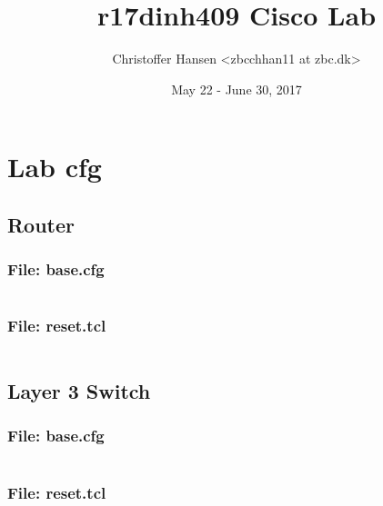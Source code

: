 \documentclass{article}
\begin{document}
\title{r17dinh409 Cisco Lab}
\author{Christoffer Hansen <zbcchhan11 at zbc.dk>}
\date{May 22 - June 30, 2017}
\maketitle

\newpage
\tableofcontents


%
%
\section{Lab cfg}


\subsection{Router}
\subsubsection{File: base.cfg}
\inputminted[frame=lines,framesep=2mm,baselinestretch=1.2,bgcolor=lightgray,fontsize=\footnotesize,linenos,breaklines=true]{tcl}{code/router/base.cfg}
\subsubsection{File: reset.tcl}
\inputminted[frame=lines,framesep=2mm,baselinestretch=1.2,bgcolor=lightgray,fontsize=\footnotesize,linenos,breaklines=true]{tcl}{code/router/reset.tcl}


\subsection{Layer 3 Switch}
\subsubsection{File: base.cfg}
\inputminted[frame=lines,framesep=2mm,baselinestretch=1.2,bgcolor=lightgray,fontsize=\footnotesize,linenos,breaklines=true]{tcl}{code/l3switch/base.cfg}
\subsubsection{File: reset.tcl}
\inputminted[frame=lines,framesep=2mm,baselinestretch=1.2,bgcolor=lightgray,fontsize=\footnotesize,linenos,breaklines=true]{tcl}{code/l3switch/reset-tcl.txt}
\end{document}
